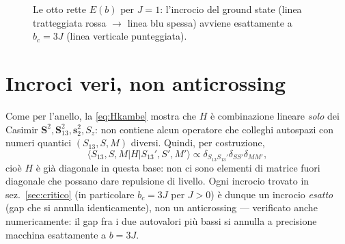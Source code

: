 \documentclass[11pt,a4paper]{article}
\begin{document}
\begin{figure}[h]
\centering
{}
\caption{Le otto rette $E(b)$ per $J=1$: l'incrocio del ground state (linea
tratteggiata rossa $\to$ linea blu spessa) avviene esattamente a $b_c=3J$
(linea verticale punteggiata).}
\label{fig:spettro}
\end{figure}

\FloatBarrier

\section{Incroci veri, non anticrossing}

Come per l'anello, la \eqref{eq:Hkambe} mostra che $H$ è combinazione
lineare \emph{solo} dei Casimir $\mathbf S^2,\mathbf S_{13}^2,\mathbf s_2^2,S_z$:
non contiene alcun operatore che colleghi autospazi con numeri quantici
$(S_{13},S,M)$ diversi. Quindi, per costruzione,
\begin{equation}
\langle S_{13},S,M|H|S_{13}',S',M'\rangle \propto \delta_{S_{13}S_{13}'}\delta_{SS'}\delta_{MM'},
\end{equation}
cioè $H$ è già diagonale in questa base: non ci sono elementi di matrice
fuori diagonale che possano dare repulsione di livello. Ogni incrocio
trovato in sez.~\ref{sec:critico} (in particolare $b_c=3J$ per $J>0$) è
dunque un incrocio \emph{esatto} (gap che si annulla identicamente), non un
anticrossing — verificato anche numericamente: il gap fra i due autovalori
più bassi si annulla a precisione macchina esattamente a $b=3J$.
\end{document}

